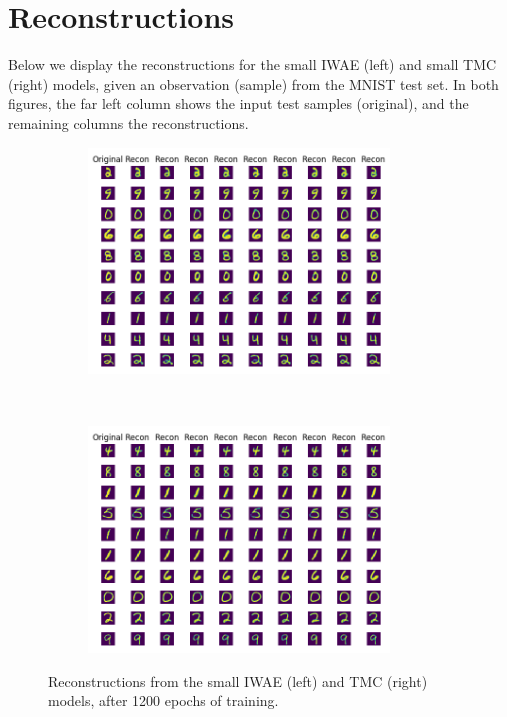     
    \section{Reconstructions}
    \label{sec:app_rec}
    Below we display the reconstructions for the small IWAE (left) and small TMC (right) models, given an observation (sample) from the MNIST test set. In both figures, the far left column shows the input test samples (original), and the remaining columns the reconstructions. 
    
    \begin{figure}[th!]
        \centering
        \begin{subfigure}[t]{0.5\textwidth}
        \hspace*{-2cm}
            \centering
            \includegraphics[height=6cm]{../openreview/Figures/IWAE_recon_small.png}
        \end{subfigure}%
        ~ 
        \begin{subfigure}[t]{0.5\textwidth}
            \centering
            \includegraphics[height=6cm]{../openreview/Figures/TMC_recon_small.png}
        \end{subfigure}
        \caption{Reconstructions from the small IWAE (left) and TMC (right) models, after 1200 epochs of training.}
        \label{fig:reconstructions}
    \end{figure}
    
